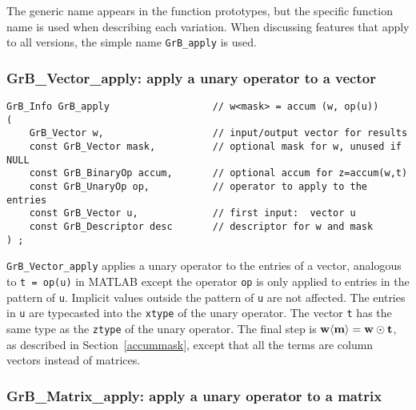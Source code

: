 \documentclass[12pt]{article}
\begin{document}
The generic
name appears in the function prototypes, but the specific function name is used
when describing each variation.  When discussing features that apply to all
versions, the simple name \verb'GrB_apply' is used.

\subsubsection{{\sf GrB\_Vector\_apply:} apply a unary operator to a vector}
\label{apply_vector}

\begin{mdframed}[userdefinedwidth=6in]
{\footnotesize
\begin{verbatim}
GrB_Info GrB_apply                  // w<mask> = accum (w, op(u))
(
    GrB_Vector w,                   // input/output vector for results
    const GrB_Vector mask,          // optional mask for w, unused if NULL
    const GrB_BinaryOp accum,       // optional accum for z=accum(w,t)
    const GrB_UnaryOp op,           // operator to apply to the entries
    const GrB_Vector u,             // first input:  vector u
    const GrB_Descriptor desc       // descriptor for w and mask
) ;
\end{verbatim} } \end{mdframed}

\verb'GrB_Vector_apply' applies a unary operator to the entries of a vector,
analogous to \verb't = op(u)'  in MATLAB except the operator \verb'op' is only
applied to entries in the pattern of \verb'u'.  Implicit values outside the
pattern of \verb'u' are not affected.  The entries in \verb'u' are typecasted
into the \verb'xtype' of the unary operator.  The vector \verb't' has the same
type as the \verb'ztype' of the unary operator.  The final step is ${\bf w
\langle m \rangle  = w \odot t}$, as described in Section~\ref{accummask},
except that all the terms are column vectors instead of matrices.

\subsubsection{{\sf GrB\_Matrix\_apply:} apply a unary operator to a matrix}
\label{apply_matrix}
\end{document}
